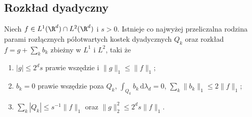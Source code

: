 \subsection{Rozkład dyadyczny}
\begin{lemat}
\label{lem:dt-cz-cz-decomp}
Niech $f\in L^1(\R^d)\cap L^2(\R^d)$ i $s>0$. Istnieje
co najwyżej przeliczalna rodzina parami rozłącznych półotwartych
kostek dyadycznych $Q_k$ oraz rozkład $f=g+\sum_k b_k$
zbieżny w $L^1$ i $L^2$, taki że
\begin{enumerate}[label=(\roman*)]
\item $|g|\le 2^ds$ prawie wszędzie i $\|g\|_1\le\|f\|_1$;
\item $b_k=0$ prawie wszędzie poza $Q_k$,
 $\int_{Q_k} b_k\,\mathrm d\lambda_d=0$,
 $\sum_k\|b_k\|_1\le2\|f\|_1$;
\item $\sum_k|Q_k|\le s^{-1}\|f\|_1$ oraz
 $\|g\|_2^2\le 2^ds\|f\|_1$.
\end{enumerate}
\end{lemat}
